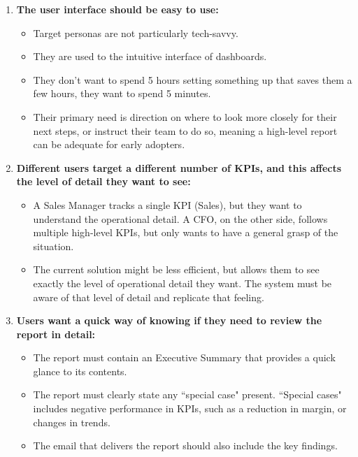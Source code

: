 \documentclass[a4paper]{report}
\begin{document}
\begin{enumerate}
    \item \textbf{The user interface should be easy to use:}
    \begin{itemize}
        \item Target personas are not particularly tech-savvy.
        \item They are used to the intuitive interface of dashboards.
        \item They don’t want to spend 5 hours setting something up that saves them a few hours, they want to spend 5 minutes.
        \item Their primary need is direction on where to look more closely for their next steps, or instruct their team to do so, meaning a high-level report can be adequate for early adopters.
    \end{itemize}

    \item \textbf{Different users target a different number of KPIs, and this affects the level of detail they want to see:}
    \begin{itemize}
        \item A Sales Manager tracks a single KPI (Sales), but they want to understand the operational detail. A CFO, on the other side, follows multiple high-level KPIs, but only wants to have a general grasp of the situation.
        \item The current solution might be less efficient, but allows them to see exactly the level of operational detail they want. The system must be aware of that level of detail and replicate that feeling.
    \end{itemize}

    \item \textbf{Users want a quick way of knowing if they need to review the report in detail:}
    \begin{itemize}
        \item The report must contain an Executive Summary that provides a quick glance to its contents.
        \item The report must clearly state any ``special case" present. ``Special cases" includes negative performance in KPIs, such as a reduction in margin, or changes in trends.
        \item The email that delivers the report should also include the key findings.
    \end{itemize}
\end{enumerate}
\end{document}
